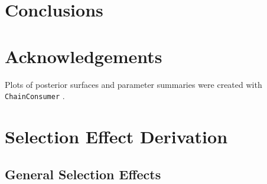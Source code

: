 \documentclass[a4paper,fleqn,usenatbib]{mnras}
\begin{document}
\section{Conclusions}



\section*{Acknowledgements}

Plots of posterior surfaces and parameter summaries were created with \verb|ChainConsumer| \citep{Hinton2016}.












\appendix

\section{Selection Effect Derivation}
\label{app:selection}

\subsection{General Selection Effects}
\end{document}
